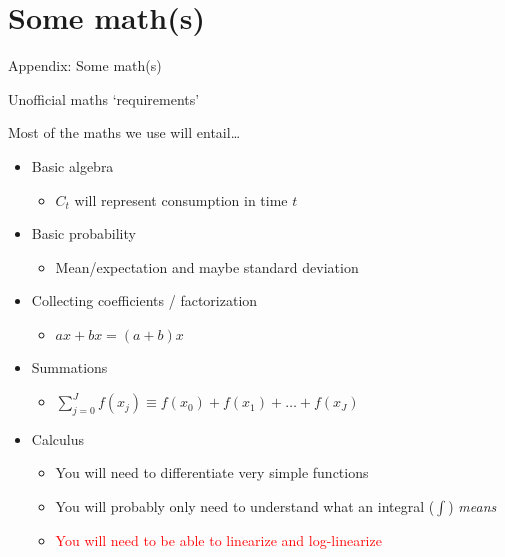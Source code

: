 \section{Some math(s)}

\begin{frame}

\begin{center}
{\LARGE Appendix: Some math(s)}
\end{center}

\end{frame}



\begin{frame}{Unofficial maths `requirements'}

Most of the maths we use will entail\ldots
\begin{itemize}
\item	Basic algebra
	\begin{itemize}
	\item	$C_{t}$ will represent consumption in time $t$
	\end{itemize}
\item	Basic probability
	\begin{itemize}
	\item	Mean/expectation and maybe standard deviation
	\end{itemize}
\item	Collecting coefficients / factorization
	\begin{itemize}
	\item	$a x + bx = (a+b)x$
	\end{itemize}
\item	Summations
	\begin{itemize}
	\item	$\sum\limits_{j=0}^{J} f(x_{j}) \equiv f(x_{0})+f(x_{1}) +\ldots+f(x_{J})$
	\end{itemize}
\item	Calculus
	\begin{itemize}
	\item	You will need to differentiate very simple functions
	\item	You will probably only need to understand what an integral ($\int$) \emph{means}
	\item	\textcolor{red}{You will need to be able to linearize and log-linearize}
	\end{itemize}
\end{itemize}

\end{frame}

